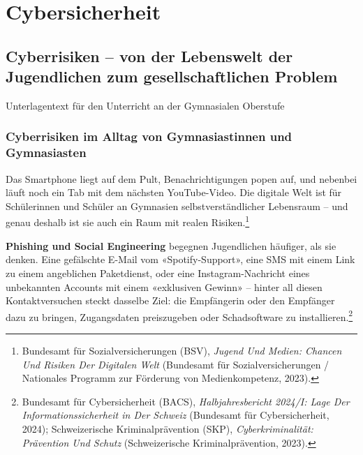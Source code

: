 \documentclass[
  nswissgerman,
  a4paper,
  DIV=11,
  numbers=noendperiod,
  ngerman]{scrreprt}
\begin{document}
\part{Cybersicherheit}

\chapter{Cyberrisiken -- von der Lebenswelt der Jugendlichen zum
gesellschaftlichen
Problem}\label{cyberrisiken-von-der-lebenswelt-der-jugendlichen-zum-gesellschaftlichen-problem}

Unterlagentext für den Unterricht an der Gymnasialen Oberstufe

\hfill\break

\section{Cyberrisiken im Alltag von Gymnasiastinnen und
Gymnasiasten}\label{cyberrisiken-im-alltag-von-gymnasiastinnen-und-gymnasiasten}

Das Smartphone liegt auf dem Pult, Benachrichtigungen popen auf, und
nebenbei läuft noch ein Tab mit dem nächsten YouTube-Video. Die digitale
Welt ist für Schülerinnen und Schüler an Gymnasien selbstverständlicher
Lebensraum -- und genau deshalb ist sie auch ein Raum mit realen
Risiken.\footnote{Bundesamt für Sozialversicherungen (BSV), \emph{Jugend
  Und Medien: {Chancen} Und Risiken Der Digitalen Welt} (Bundesamt für
  Sozialversicherungen / Nationales Programm zur Förderung von
  Medienkompetenz, 2023).}

\textbf{Phishing und Social Engineering} begegnen Jugendlichen häufiger,
als sie denken. Eine gefälschte E-Mail vom «Spotify-Support», eine SMS
mit einem Link zu einem angeblichen Paketdienst, oder eine
Instagram-Nachricht eines unbekannten Accounts mit einem «exklusiven
Gewinn» -- hinter all diesen Kontaktversuchen steckt dasselbe Ziel: die
Empfängerin oder den Empfänger dazu zu bringen, Zugangsdaten
preiszugeben oder Schadsoftware zu installieren.\footnote{Bundesamt für
  Cybersicherheit (BACS), \emph{Halbjahresbericht 2024/{I}: {Lage} Der
  Informationssicherheit in Der Schweiz} (Bundesamt für Cybersicherheit,
  2024); Schweizerische Kriminalprävention (SKP),
  \emph{Cyberkriminalität: {Prävention} Und Schutz} (Schweizerische
  Kriminalprävention, 2023).}
\end{document}
